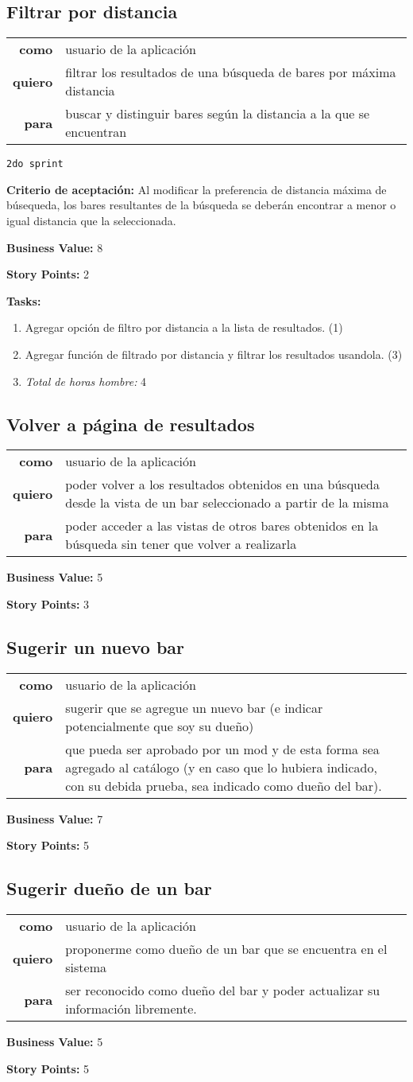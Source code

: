 \documentclass[hidelinks,a4paper,11pt, nofootinbib]{article}
\newcommand{\userstory}[3]{
\begin{tabular}{|r p{10cm}|}
  \hline
  \textbf{como} & #1 \\
  \textbf{quiero} & #2 \\
  \textbf{para} & #3 \\
  \hline
\end{tabular}

}
\newcommand{\critdeacep}[1]{\textbf{Criterio de aceptación:} #1

}
\newcommand{\busvalue}[1]{\textbf{Business Value:} #1

}
\newcommand{\storypoints}[1]{\textbf{Story Points:} #1

}
\newcommand{\segundosprint}{\texttt{2do sprint}

}
\newcommand{\tasks}[1]{\textbf{Tasks:} 

#1}
\begin{document}
\subsection*{Filtrar por distancia}
\userstory{usuario de la aplicación}{filtrar los resultados de una búsqueda de bares por máxima distancia}{buscar y distinguir bares según la distancia a la que se encuentran}
\segundosprint
\critdeacep{Al modificar la preferencia de distancia máxima de búsequeda, los bares resultantes de la búsqueda se deberán encontrar a menor o igual distancia que la seleccionada.}
\busvalue{8}
\storypoints{2}
\tasks{
  \begin{enumerate}
    \item Agregar opción de filtro por distancia a la lista de resultados. (1)
    \item Agregar función de filtrado por distancia y filtrar los resultados usandola. (3)
    \item[] \textit{Total de horas hombre:} 4
  \end{enumerate}
}

\subsection*{Volver a página de resultados}
\userstory{usuario de la aplicación}{poder volver a los resultados obtenidos en una búsqueda desde la vista de un bar seleccionado a partir de la misma}{poder acceder a las vistas de otros bares obtenidos en la búsqueda sin tener que volver a realizarla}
\busvalue{5}
\storypoints{3}

\subsection*{Sugerir un nuevo bar}
\userstory{usuario de la aplicación}{sugerir que se agregue un nuevo bar (e indicar potencialmente que soy su dueño)}{que pueda ser aprobado por un mod y de esta forma sea agregado al catálogo (y en caso que lo hubiera indicado, con su debida prueba, sea indicado como dueño del bar).}
\busvalue{7}
\storypoints{5}

\subsection*{Sugerir dueño de un bar}
\userstory{usuario de la aplicación}{proponerme como dueño de un bar que se encuentra en el sistema}{ser reconocido como dueño del bar y poder actualizar su información libremente.}
\busvalue{5}
\storypoints{5}
\end{document}
